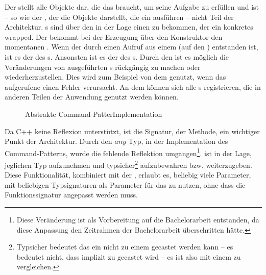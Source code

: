       Der  stellt alle Objekte dar, die das  braucht, um seine Aufgabe zu erfüllen und ist -- so wie der , der die Objekte darstellt, die ein  ausführen -- nicht Teil der Architektur. s sind über den  in der Lage einen  zu bekommen, der ein konkretes  wrapped. Der  bekommt bei der Erzeugung über den Konstruktor den momentanen . Wenn der  durch einen Aufruf aus einem  (auf den ) entstanden ist, ist es der  des s. Ansonsten ist es der  des s. Durch den  ist es möglich die Veränderungen von ausgeführten s rückgängig zu machen oder wiederherzustellen. Dies wird zum Beispiel von dem  genutzt, wenn das aufgerufene  einen Fehler verursacht. An dem  können sich alle s registrieren, die in anderen Teilen der Anwendung genutzt werden können.

      \begin{figure}[H]
        \centering
        \caption{Abstrakte Command-PatterImplementation}
        \label{fig:commanduml}
      \end{figure}

      Da C++ keine Reflexion \autocites{vinoski2005time}{ferber1989computational} unterstützt, ist die Signatur, der  Methode, ein wichtiger Punkt der Architektur. Durch den \myTIn$any$ \autocite{cpp-fundamentals} Typ, in der Implementation des Command-Patterns, wurde die fehlende Reflektion umgangen\footnote{
         Diese Veränderung ist als Vorbereitung auf die Bachelorarbeit entstanden, da diese Anpassung den Zeitrahmen der Bachelorarbeit überschritten hätte.
      }.  ist in der Lage, jeglichen Typ aufzunehmen und typsicher\footnote{
        Typsicher bedeutet das ein  nicht zu einem  gecastet werden kann -- es bedeutet nicht, dass  implizit zu  gecastet wird -- es ist also mit einem  zu vergleichen.
      } aufzubewahren bzw. weiterzugeben. Diese Funktionalität, kombiniert mit der , erlaubt es, beliebig viele Parameter, mit beliebigen Typsignaturen als Parameter für das  zu nutzen, ohne dass die Funktionssignatur angepasst werden muss.

